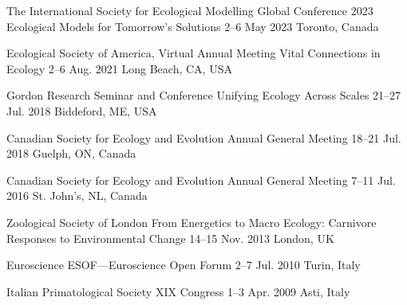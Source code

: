 

\begin{cventries}

  \cventry
    {The International Society for Ecological Modelling Global Conference 2023} %
    {Ecological Models for Tomorrow's Solutions} %
    {2--6 May 2023} %
    {Toronto, Canada} %
    {
    }

  \cventry
    {Ecological Society of America, Virtual Annual Meeting} %
    {Vital Connections in Ecology} %
    {2--6 Aug. 2021} %
    {Long Beach, CA, USA} %
    {
    }

  \cventry
    {Gordon Research Seminar and Conference} %
    {Unifying Ecology Across Scales} %
    {21--27 Jul. 2018} %
    {Biddeford, ME, USA} %
    {
    }

  \cventry
    {Canadian Society for Ecology and Evolution} %
    {Annual General Meeting} %
    {18--21 Jul. 2018} %
    {Guelph, ON, Canada} %
    {
    }

  \cventry
    {Canadian Society for Ecology and Evolution} %
    {Annual General Meeting} %
    {7--11 Jul. 2016} %
    {St. John's, NL, Canada} %
    {
    }

  \cventry
    {Zoological Society of London} %
    {From Energetics to Macro Ecology: Carnivore Responses to Environmental Change} %
    {14--15 Nov. 2013} %
    {London, UK} %
    {
    }

  \cventry
    {Euroscience} %
    {ESOF---Euroscience Open Forum} %
    {2--7 Jul. 2010} %
    {Turin, Italy} %
    {
    }

  \cventry
    {Italian Primatological Society} %
    {XIX Congress} %
    {1--3 Apr. 2009} %
    {Asti, Italy} %
    {
    }

\end{cventries}
